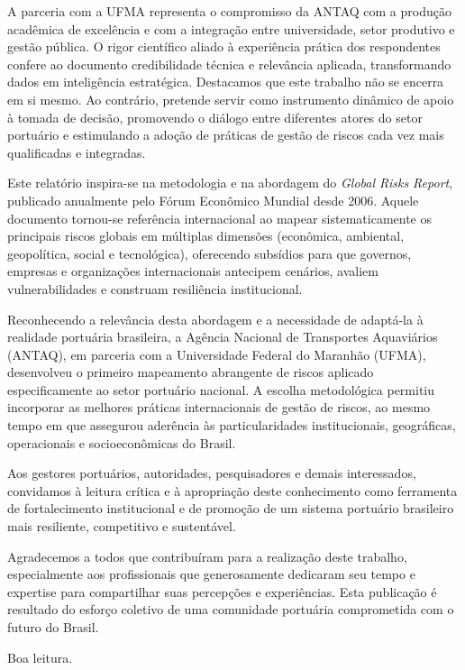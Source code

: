 \documentclass[
  portuguese,
  letterpaper,
  DIV=11,
  numbers=noendperiod]{scrreprt}
\begin{document}
A parceria com a UFMA representa o compromisso da ANTAQ com a produção
acadêmica de excelência e com a integração entre universidade, setor
produtivo e gestão pública. O rigor científico aliado à experiência
prática dos respondentes confere ao documento credibilidade técnica e
relevância aplicada, transformando dados em inteligência estratégica.
Destacamos que este trabalho não se encerra em si mesmo. Ao contrário,
pretende servir como instrumento dinâmico de apoio à tomada de decisão,
promovendo o diálogo entre diferentes atores do setor portuário e
estimulando a adoção de práticas de gestão de riscos cada vez mais
qualificadas e integradas.

Este relatório inspira-se na metodologia e na abordagem do \emph{Global
Risks Report}, publicado anualmente pelo Fórum Econômico Mundial desde
2006. Aquele documento tornou-se referência internacional ao mapear
sistematicamente os principais riscos globais em múltiplas dimensões
(econômica, ambiental, geopolítica, social e tecnológica), oferecendo
subsídios para que governos, empresas e organizações internacionais
antecipem cenários, avaliem vulnerabilidades e construam resiliência
institucional.

Reconhecendo a relevância desta abordagem e a necessidade de adaptá-la à
realidade portuária brasileira, a Agência Nacional de Transportes
Aquaviários (ANTAQ), em parceria com a Universidade Federal do Maranhão
(UFMA), desenvolveu o primeiro mapeamento abrangente de riscos aplicado
especificamente ao setor portuário nacional. A escolha metodológica
permitiu incorporar as melhores práticas internacionais de gestão de
riscos, ao mesmo tempo em que assegurou aderência às particularidades
institucionais, geográficas, operacionais e socioeconômicas do Brasil.

Aos gestores portuários, autoridades, pesquisadores e demais
interessados, convidamos à leitura crítica e à apropriação deste
conhecimento como ferramenta de fortalecimento institucional e de
promoção de um sistema portuário brasileiro mais resiliente, competitivo
e sustentável.

Agradecemos a todos que contribuíram para a realização deste trabalho,
especialmente aos profissionais que generosamente dedicaram seu tempo e
expertise para compartilhar suas percepções e experiências. Esta
publicação é resultado do esforço coletivo de uma comunidade portuária
comprometida com o futuro do Brasil.

Boa leitura.

\end{document}
